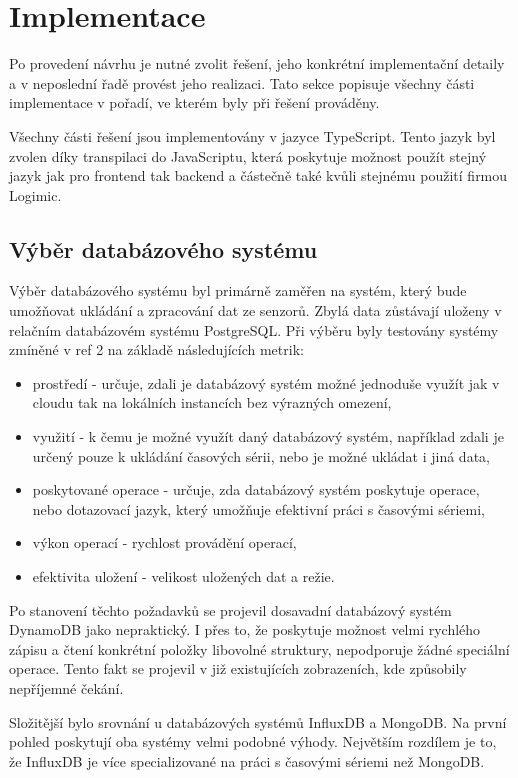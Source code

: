\chapter{Implementace}
\label{chapter_implemenatation}
Po provedení návrhu je nutné zvolit řešení, jeho konkrétní implementační detaily a v neposlední řadě provést jeho realizaci. Tato sekce popisuje všechny části implementace v pořadí, ve kterém byly při řešení prováděny.

Všechny části řešení jsou implementovány v jazyce TypeScript. Tento jazyk byl zvolen díky transpilaci do JavaScriptu, která poskytuje možnost použít stejný jazyk jak pro frontend tak backend a částečně také kvůli stejnému použití firmou Logimic. 
\section{Výběr databázového systému}
Výběr databázového systému byl primárně zaměřen na systém, který bude umožňovat ukládání a zpracování dat ze senzorů. Zbylá data zůstávají uloženy v relačním databázovém systému PostgreSQL. Při výběru byly testovány systémy zmíněné v ref 2 na základě následujících metrik:
\begin{itemize}
\item prostředí - určuje, zdali je databázový systém možné jednoduše využít jak v cloudu tak na lokálních instancích bez výrazných omezení,
\item využití - k čemu je možné využít daný databázový systém, například zdali je určený pouze k ukládání časových sérii, nebo je možné ukládat i jiná data,
\item poskytované operace - určuje, zda databázový systém poskytuje operace, nebo dotazovací jazyk, který umožňuje efektivní práci s časovými sériemi,
\item výkon operací - rychlost provádění operací,
\item efektivita uložení - velikost uložených dat a režie.
\end{itemize}
Po stanovení těchto požadavků se projevil dosavadní databázový systém DynamoDB jako nepraktický. I přes to, že poskytuje možnost velmi rychlého zápisu a čtení konkrétní položky libovolné struktury, nepodporuje žádné speciální operace. Tento fakt se projevil v již existujících zobrazeních, kde způsobily nepříjemné čekání.

Složitější bylo srovnání u databázových systémů InfluxDB a MongoDB. Na první pohled poskytují oba systémy velmi podobné výhody. Největším rozdílem je to, že InfluxDB je více specializované na práci s časovými sériemi než MongoDB.

